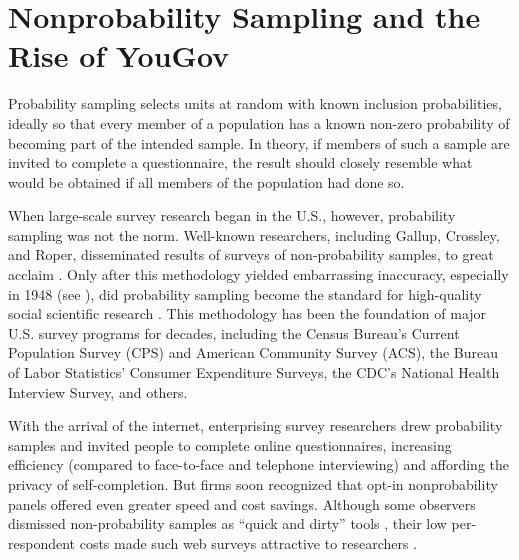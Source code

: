 \documentclass[12pt]{article}
\begin{document}
\section*{Nonprobability Sampling and the Rise of YouGov}

Probability sampling selects units at random with known inclusion probabilities, ideally so that every member of a population has a known non-zero probability of becoming part of the intended sample. In theory, if members of such a sample are invited to complete a questionnaire, the result should closely resemble what would be obtained if all members of the population had done so.  


When large-scale survey research began in the U.S., however, probability sampling was not the norm. Well-known researchers, including Gallup, Crossley, and Roper, disseminated results of surveys of non-probability samples, to great acclaim \parencite{crossley_straw_1937}. Only after this methodology yielded embarrassing inaccuracy, especially in 1948 (see \cite{mosteller_pre_election_1949}), did probability sampling become the standard for high-quality social scientific research \parencite{cornesse_review_2020}. This methodology has been the foundation of major U.S. survey programs for decades, including the Census Bureau’s Current Population Survey (CPS) and American Community Survey (ACS), the Bureau of Labor Statistics’ Consumer Expenditure Surveys, the CDC’s National Health Interview Survey, and others. 

With the arrival of the internet, enterprising survey researchers drew probability samples and invited people to complete online questionnaires, increasing efficiency (compared to face-to-face and telephone interviewing) and affording the privacy of self-completion. But firms soon recognized that opt-in nonprobability panels offered even greater speed and cost savings. Although some observers dismissed non-probability samples as “quick and dirty” tools \parencite{bethlehem_selection_2010}, their low per-respondent costs made such web surveys attractive to researchers \parencite{wright_researching_2005}.
\end{document}
